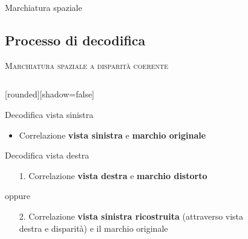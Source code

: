 \documentclass{beamer}
\begin{document}
\begin{section}{Marchiatura spaziale}
\subsection{Processo di decodifica}
\begin{frame}[t]{\textsc{Marchiatura spaziale a disparit\`{a} coerente}}
\vspace{-2em}
\begin{columns}
\begin{column}{6cm}
	[rounded][shadow=false]
\vspace{1em}
\begin{block}{Decodifica vista sinistra}
\begin{itemize}
\item Correlazione \textbf{vista sinistra} e \textbf{marchio originale}
\end{itemize}
\end{block}
\begin{block}{Decodifica vista destra}
\begin{itemize}
\item[1.] Correlazione \textbf{vista destra} e \textbf{marchio distorto}
\end{itemize}
\vspace{-0.5em}
oppure
\begin{itemize}
\item[2.] Correlazione \textbf{vista sinistra ricostruita} (attraverso vista destra e disparit\`{a}) e il marchio originale
\end{itemize}
\end{block}
\end{column}
\begin{column}{5cm}
\vspace{2em}
\begin{center}
\begin{figure}

\end{figure}
\end{center}
\end{column}
\end{columns}
\end{frame}
\end{section}
\end{document}

